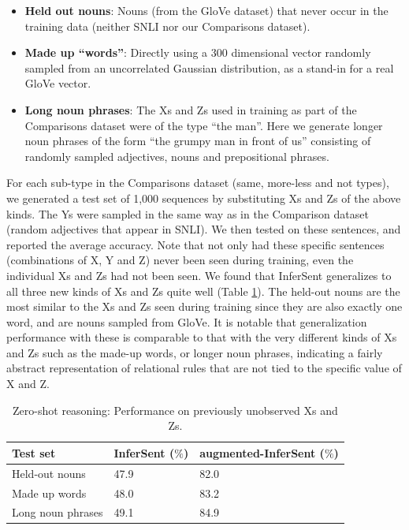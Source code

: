 \begin{itemize}
\itemsep0em
    \item \textbf{Held out nouns}: Nouns (from the GloVe dataset) that never occur in the training data (neither SNLI nor our Comparisons dataset).
    \item \textbf{Made up ``words''}: Directly using a 300 dimensional vector randomly sampled from an uncorrelated Gaussian distribution, as a stand-in for a real GloVe vector.
    \item \textbf{Long noun phrases}: The Xs and Zs used in training as part of the Comparisons dataset were of the type ``the man''. Here we generate longer noun phrases of the form ``the grumpy man in front of us'' consisting of randomly sampled adjectives, nouns and prepositional phrases. 
\end{itemize}

For each sub-type in the Comparisons dataset (same, more-less and not types), we generated a test set of 1,000 sequences by substituting Xs and Zs of the above kinds. The Ys were sampled in the same way as in the Comparison dataset (random adjectives that appear in SNLI). We then tested on these sentences, and reported the average accuracy. Note that not only had these specific sentences (combinations of X, Y and Z) never been seen during training, even the individual Xs and Zs had not been seen. We found that InferSent generalizes to all three new kinds of Xs and Zs quite well (Table \ref{tab:zsl}). The held-out nouns are the most similar to the Xs and Zs seen during training since they are also exactly one word, and are nouns sampled from GloVe. It is notable that generalization performance with these is comparable to that with the very different kinds of Xs and Zs such as the made-up words, or longer noun phrases, indicating a fairly abstract representation of relational rules that are not tied to the specific value of X and Z.

\begin{table}[h!]
  \begin{center}
    \begin{tabular}{lll}
    \toprule
      Test set  & InferSent ($\%$)&  augmented-InferSent ($\%$)\\
    \midrule
    Held-out nouns & 47.9 & 82.0 \\
    Made up words & 48.0 & 83.2  \\
    Long noun phrases & 49.1  & 84.9 \\
\bottomrule
\end{tabular}
\end{center}
\caption{Zero-shot reasoning: Performance on previously unobserved Xs and Zs.}
  \label{tab:zsl}
\end{table}

